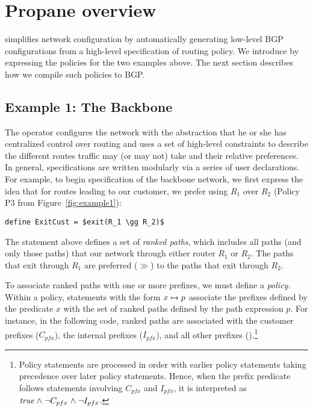 \section{Propane overview}
\label{sec:propane}

\sysname simplifies network configuration by automatically generating low-level BGP configurations from a high-level specification of routing policy.
%
%
We introduce \sysname by expressing the policies for the two examples above.
%
The next section describes how we compile such policies to BGP.

\subsection{Example 1: The Backbone}


The operator configures the network with the abstraction that he or she has centralized control over routing and uses a set of high-level constraints to describe the different routes traffic may (or may not) take and their relative preferences.
In general, \sysname specifications are written modularly via a series
of user declarations.
For example, to begin specification of the backbone
network, we first express the idea that for routes leading to our customer,
we prefer using $R_1$ over $R_2$ (Policy P3 from Figure~\ref{fig:example1}):
\begin{lstlisting}[mathescape=true]
define ExitCust = $exit(R_1 \gg R_2)$
\end{lstlisting}
The  statement above defines a set of \emph{ranked paths}, which includes
all paths (and only those paths) that 
our network
through either router $R_1$ or $R_2$.  The paths that exit through $R_1$
are preferred ($\gg$) to the paths that exit through $R_2$.

To associate ranked paths with
one or more prefixes, we must define a \sysname \emph{policy}.
Within a policy, statements with the form $x \mapsto p$
associate the prefixes defined by the predicate $x$ with the set of
ranked paths defined by the path expression $p$.
For instance, in the following code, ranked paths are associated with
the customer prefixes ($C_{pfx}$), the internal prefixes ($I_{pfx}$),
and all other prefixes ().\footnote{Policy statements are processed in
order with earlier policy statements taking precedence over later
policy statements.  Hence, when the prefix predicate  follows
statements involving $C_{pfx}$ and $I_{pfx}$, it is interpreted as
$\textit{true} \mathrel{\wedge} \neg C_{pfx} \mathrel{\wedge} \neg I_{pfx}$.}

